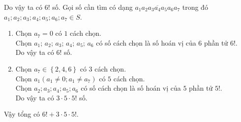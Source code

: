 \begin{ex}
{\begin{itemchoice}
			Do vậy ta có $6!$  số.
			 \itemch
			Gọi số cần tìm có dạng $\overline{a_1a_2a_3a_4a_5a_6  a_7}$ trong đó $a_1;a_2;a_3;a_4;a_5;a_6;a_7 \in S$.
			\begin{enumerate}
				\item Chọn $a_7=0$  có $1$ cách chọn.\\
				Chọn $a_1$; $a_2$;  $a_3$; $a_4$; $a_5$; $a_6$ có số cách chọn là số hoán vị của $6$ phần tử $6!$.\\
				 Do vậy ta có $6!$ số.
				\item Chọn $a_7 \in \left\{2,4,6\right\}$ có $3$  cách chọn.\\
				Chọn $a_1 (a_1 \ne 0; a_1  \ne a_7)$ có $5$ cách chọn.\\
				Chọn $a_2;a_3;a_4;a_5;a_6$ có số cách chọn là số  hoán vị của $5$ phần tử $5!$.\\
				Do vậy  ta có $3\cdot 5\cdot 5!$ số.
			\end{enumerate}
			 Vậy tổng có $6!+3\cdot 5\cdot 5!$.
		\end{itemchoice}
	 }
\end{ex}

